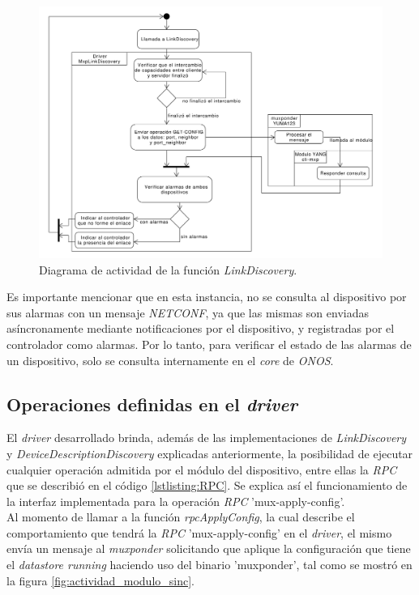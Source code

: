 \begin{figure}[!h]
    \centering
    \includegraphics[scale=0.43]{Figures/actividad_link.pdf}
    \caption{Diagrama de actividad de la función \textit{LinkDiscovery}.}
    \label{fig:actividad_link}
  \end{figure}

  Es importante mencionar que en esta instancia, no se consulta al dispositivo por sus alarmas con un mensaje \textit{NETCONF}, ya que las mismas son enviadas asíncronamente mediante notificaciones por el dispositivo, y registradas por el controlador como alarmas. Por lo tanto, para verificar el estado de las alarmas de un dispositivo, solo se consulta internamente en el \textit{core} de \textit{ONOS}.

  \subsection{Operaciones definidas en el \textit{driver}} \label{drivermux}

  El \textit{driver} desarrollado brinda, además de las implementaciones de \textit{LinkDiscovery} y \textit{DeviceDescriptionDiscovery} explicadas anteriormente, la posibilidad de ejecutar cualquier operación admitida por el módulo del dispositivo, entre ellas la \textit{RPC} que se describió en el código \ref{lstlisting:RPC}. Se explica así el funcionamiento de la interfaz implementada para la operación \textit{RPC} 'mux-apply-config'. 
  \\

  Al momento de llamar a la función \textit{rpcApplyConfig}, la cual describe el comportamiento que tendrá la \textit{RPC} 'mux-apply-config' en el \textit{driver}, el mismo envía un mensaje al \textit{muxponder} solicitando que aplique la configuración que tiene el \textit{datastore running} haciendo uso del binario 'muxponder', tal como se mostró en la figura \ref{fig:actividad_modulo_sinc}.
  

